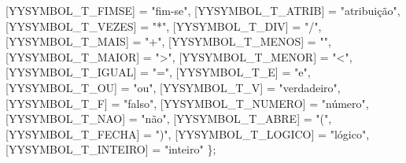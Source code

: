 \documentclass[
  brazilian,
  letterpaper,
]{book}
\newenvironment{Shaded}{\begin{snugshade}}{\end{snugshade}}
\newcommand{\NormalTok}[1]{\textcolor[rgb]{0.00,0.23,0.31}{#1}}
\newcommand{\OperatorTok}[1]{\textcolor[rgb]{0.37,0.37,0.37}{#1}}
\newcommand{\StringTok}[1]{\textcolor[rgb]{0.13,0.47,0.30}{#1}}
\theoremstyle{plain}
\theoremstyle{definition}
\theoremstyle{remark}
\begin{document}
\begin{Shaded}
\begin{Highlighting}[]
        \OperatorTok{[}\NormalTok{YYSYMBOL\_T\_FIMSE}\OperatorTok{]}     \OperatorTok{=} \StringTok{"fim{-}se"}\OperatorTok{,}
        \OperatorTok{[}\NormalTok{YYSYMBOL\_T\_ATRIB}\OperatorTok{]}     \OperatorTok{=} \StringTok{"atribuição"}\OperatorTok{,}
        \OperatorTok{[}\NormalTok{YYSYMBOL\_T\_VEZES}\OperatorTok{]}     \OperatorTok{=} \StringTok{"\textquotesingle{}*\textquotesingle{}"}\OperatorTok{,}
        \OperatorTok{[}\NormalTok{YYSYMBOL\_T\_DIV}\OperatorTok{]}       \OperatorTok{=} \StringTok{"\textquotesingle{}/\textquotesingle{}"}\OperatorTok{,}
        \OperatorTok{[}\NormalTok{YYSYMBOL\_T\_MAIS}\OperatorTok{]}      \OperatorTok{=} \StringTok{"\textquotesingle{}+\textquotesingle{}"}\OperatorTok{,}
        \OperatorTok{[}\NormalTok{YYSYMBOL\_T\_MENOS}\OperatorTok{]}     \OperatorTok{=} \StringTok{"\textquotesingle{}{-}\textquotesingle{}"}\OperatorTok{,}
        \OperatorTok{[}\NormalTok{YYSYMBOL\_T\_MAIOR}\OperatorTok{]}     \OperatorTok{=} \StringTok{"\textquotesingle{}\textgreater{}\textquotesingle{}"}\OperatorTok{,}
        \OperatorTok{[}\NormalTok{YYSYMBOL\_T\_MENOR}\OperatorTok{]}     \OperatorTok{=} \StringTok{"\textquotesingle{}\textless{}\textquotesingle{}"}\OperatorTok{,}
        \OperatorTok{[}\NormalTok{YYSYMBOL\_T\_IGUAL}\OperatorTok{]}     \OperatorTok{=} \StringTok{"\textquotesingle{}=\textquotesingle{}"}\OperatorTok{,}
        \OperatorTok{[}\NormalTok{YYSYMBOL\_T\_E}\OperatorTok{]}         \OperatorTok{=} \StringTok{"e"}\OperatorTok{,}
        \OperatorTok{[}\NormalTok{YYSYMBOL\_T\_OU}\OperatorTok{]}        \OperatorTok{=} \StringTok{"ou"}\OperatorTok{,}
        \OperatorTok{[}\NormalTok{YYSYMBOL\_T\_V}\OperatorTok{]}         \OperatorTok{=} \StringTok{"verdadeiro"}\OperatorTok{,}
        \OperatorTok{[}\NormalTok{YYSYMBOL\_T\_F}\OperatorTok{]}         \OperatorTok{=} \StringTok{"falso"}\OperatorTok{,}
        \OperatorTok{[}\NormalTok{YYSYMBOL\_T\_NUMERO}\OperatorTok{]}    \OperatorTok{=} \StringTok{"número"}\OperatorTok{,}
        \OperatorTok{[}\NormalTok{YYSYMBOL\_T\_NAO}\OperatorTok{]}       \OperatorTok{=} \StringTok{"não"}\OperatorTok{,}
        \OperatorTok{[}\NormalTok{YYSYMBOL\_T\_ABRE}\OperatorTok{]}      \OperatorTok{=} \StringTok{"\textquotesingle{}(\textquotesingle{}"}\OperatorTok{,}
        \OperatorTok{[}\NormalTok{YYSYMBOL\_T\_FECHA}\OperatorTok{]}     \OperatorTok{=} \StringTok{"\textquotesingle{})\textquotesingle{}"}\OperatorTok{,}
        \OperatorTok{[}\NormalTok{YYSYMBOL\_T\_LOGICO}\OperatorTok{]}    \OperatorTok{=} \StringTok{"lógico"}\OperatorTok{,}
        \OperatorTok{[}\NormalTok{YYSYMBOL\_T\_INTEIRO}\OperatorTok{]}   \OperatorTok{=} \StringTok{"inteiro"}
    \OperatorTok{\};}


\end{Highlighting}
\end{Shaded}
\end{document}

